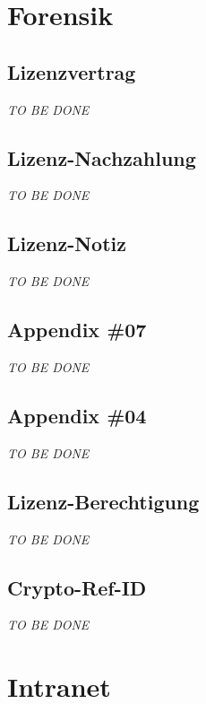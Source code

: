 \documentclass[12pt,a4paper,titlepage,oneside]{scrartcl}
\begin{document}
\maketitle
\setcounter{section}{0}
\setcounter{tocdepth}{2}
\tableofcontents

%
%

\section{Forensik}

\subsection{Lizenzvertrag}
\emph{TO BE DONE}

\subsection{Lizenz-Nachzahlung}
\emph{TO BE DONE}

\subsection{Lizenz-Notiz}
\emph{TO BE DONE}

\subsection{Appendix \#07}
\emph{TO BE DONE}

\subsection{Appendix \#04}
\emph{TO BE DONE}

\subsection{Lizenz-Berechtigung}
\emph{TO BE DONE}

\subsection{Crypto-Ref-ID}
\emph{TO BE DONE}

\section{Intranet}
\end{document}
